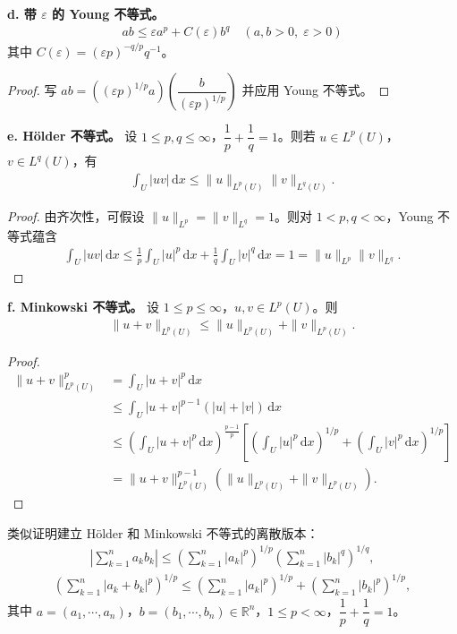 \documentclass[../main.tex]{subfiles}
\begin{document}
\textbf{d. 带 $\varepsilon$ 的 Young 不等式。}
\begin{align}
ab\leqslant\varepsilon a^p+C(\varepsilon)b^q \quad (a,b>0,\;\varepsilon>0)
\label{align:appB-YoungEps}
\end{align}
其中 $C(\varepsilon)=(\varepsilon p)^{-q/p}q^{-1}$。
\begin{proof}
写 $ab=((\varepsilon p)^{1/p}a)\left(\dfrac{b}{(\varepsilon p)^{1/p}}\right)$ 并应用 Young 不等式。
\end{proof}

\textbf{e. H\"older 不等式。} 设 $1\leqslant p,q\leqslant\infty$，$\dfrac{1}{p}+\dfrac{1}{q}=1$。则若 $u\in L^p(U)$，$v\in L^q(U)$，有
\begin{align}
\int_U|uv|\,\mathrm{d}x\leqslant\|u\|_{L^p(U)}\|v\|_{L^q(U)}.
\label{align:appB-Holder}
\end{align}
\begin{proof}
由齐次性，可假设 $\|u\|_{L^p}=\|v\|_{L^q}=1$。则对 $1<p,q<\infty$，Young 不等式蕴含
\begin{align*}
\int_U|uv|\,\mathrm{d}x\leqslant\frac{1}{p}\int_U|u|^p\,\mathrm{d}x+\frac{1}{q}\int_U|v|^q\,\mathrm{d}x=1=\|u\|_{L^p}\|v\|_{L^q}.
\end{align*}
\end{proof}

\textbf{f. Minkowski 不等式。} 设 $1\leqslant p\leqslant\infty$，$u,v\in L^p(U)$。则
\begin{align}
\|u+v\|_{L^p(U)}\leqslant\|u\|_{L^p(U)}+\|v\|_{L^p(U)}.
\label{align:appB-Minkowski}
\end{align}
\begin{proof}
\begin{align*}
\|u+v\|_{L^p(U)}^p &=\int_U|u+v|^p\,\mathrm{d}x\\
&\leqslant\int_U|u+v|^{p-1}(|u|+|v|)\,\mathrm{d}x\\
&\leqslant\left(\int_U|u+v|^p\,\mathrm{d}x\right)^{\frac{p-1}{p}}
\left[\left(\int_U|u|^p\,\mathrm{d}x\right)^{1/p}
+\left(\int_U|v|^p\,\mathrm{d}x\right)^{1/p}\right]\\
&=\|u+v\|_{L^p(U)}^{p-1}(\|u\|_{L^p(U)}+\|v\|_{L^p(U)}).
\end{align*}
\end{proof}

\begin{remark}\label{remark:appB-离散版本}
类似证明建立 H\"older 和 Minkowski 不等式的离散版本：
\begin{align}
\left|\sum_{k=1}^n a_kb_k\right|\leqslant\left(\sum_{k=1}^n|a_k|^p\right)^{1/p}\left(\sum_{k=1}^n|b_k|^q\right)^{1/q},
\label{align:appB-离散Holder}
\end{align}
\begin{align*}
\left(\sum_{k=1}^n|a_k+b_k|^p\right)^{1/p}\leqslant\left(\sum_{k=1}^n|a_k|^p\right)^{1/p}+\left(\sum_{k=1}^n|b_k|^p\right)^{1/p},
\end{align*}
其中 $a=(a_1,\cdots,a_n)$，$b=(b_1,\cdots,b_n)\in\mathbb{R}^n$，$1\leqslant p<\infty$，$\dfrac{1}{p}+\dfrac{1}{q}=1$。
\end{remark}
\end{document}
